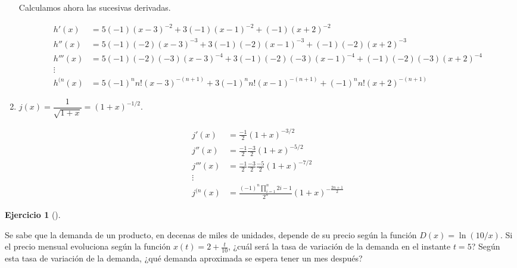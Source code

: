 \documentclass[
  a4paper,
]{scrreport}
\theoremstyle{definition}
\newtheorem{exercise}{Ejercicio}[chapter]
\theoremstyle{remark}
\begin{document}
\begin{tcolorbox}
\begin{enumerate}
  Calculamos ahora las sucesivas derivadas.

  \begin{align*}
   h'(x) & = 5(-1)(x-3)^{-2}+3(-1)(x-1)^{-2}+(-1)(x+2)^{-2}\\ 
   h''(x) &= 5(-1)(-2)(x-3)^{-3}+3(-1)(-2)(x-1)^{-3}+(-1)(-2)(x+2)^{-3}\\
   h'''(x) &= 5(-1)(-2)(-3)(x-3)^{-4}+3(-1)(-2)(-3)(x-1)^{-4}+(-1)(-2)(-3)(x+2)^{-4}\\
   \vdots \\ 
   h^{(n}(x) &= 5(-1)^n n!(x-3)^{-(n+1)}+ 3(-1)^n n!(x-1)^{-(n+1)} + (-1)^n n!(x+2)^{-(n+1)}
   \end{align*}
\item
  \(j(x)=\dfrac{1}{\sqrt{1+x}}=(1+x)^{-1/2}\).

  \begin{align*}
   j'(x) &= \frac{-1}{2}(1+x)^{-3/2}\\ 
   j''(x) &= \frac{-1}{2}\frac{-3}{2}(1+x)^{-5/2}\\ 
   j'''(x) &= \frac{-1}{2}\frac{-3}{2}\frac{-5}{2}(1+x)^{-7/2}\\ 
   \vdots \\ 
   j^{(n}(x) &= \frac{(-1)^n \prod_{i=1}^{n}2i-1}{2^n}(1+x)^{-\frac{2n+1}{2}}
   \end{align*}
\end{enumerate}

\end{tcolorbox}

\begin{exercise}[]\protect\hypertarget{exr-regla-cadena-1}{}\label{exr-regla-cadena-1}

Se sabe que la demanda de un producto, en decenas de miles de unidades,
depende de su precio según la función \(D(x)=\ln(10/x)\). Si el precio
mensual evoluciona según la función \(x(t)=2+\frac{t}{10}\), ¿cuál será
la tasa de variación de la demanda en el instante \(t=5\)? Según esta
tasa de variación de la demanda, ¿qué demanda aproximada se espera tener
un mes después?

\end{exercise}
\end{document}
